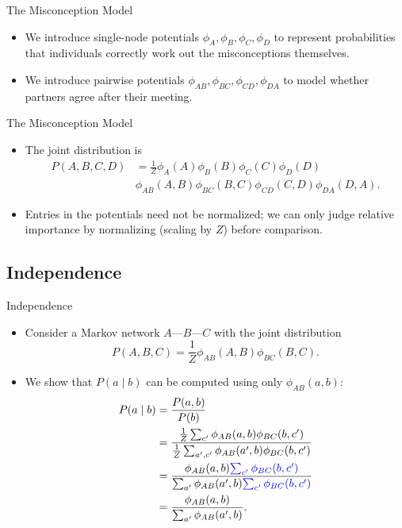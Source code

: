 \documentclass[11pt]{beamer}
\begin{document}
\begin{frame}{The Misconception Model \cite{pgmslides}}
\setlength{\topsep}{0pt}
\setlength{\partopsep}{0pt}
\vspace{0pt}
\centering
\begin{figure}[!t]
\resizebox{0.3\textwidth}{!}{\misconceptionmrf}
\end{figure}
\begin{itemize}
	\item We introduce single-node potentials $\phi_{A}, \phi_{B}, \phi_{C},
	\phi_{D}$ to represent probabilities that individuals correctly work out
	the misconceptions themselves.
	\item We introduce pairwise potentials $\phi_{AB}, \phi_{BC}, \phi_{CD},
	\phi_{DA}$ to model whether partners agree after their meeting.
\end{itemize}
\end{frame}

\begin{frame}{The Misconception Model \cite{pgmslides}}
\begin{itemize}
	\item The joint distribution is
	\begin{align*}
		P(A,B,C,D) &= \frac{1}{Z}\phi_A(A)\phi_B(B)\phi_C(C)\phi_D(D) \\
		&\phi_{AB}(A,B)\phi_{BC}(B,C)\phi_{CD}(C,D)\phi_{DA}(D,A).
	\end{align*}
	\item Entries in the potentials need not be normalized; we can only
	judge relative importance by normalizing (scaling by $Z$) before
	comparison.
\end{itemize}
\end{frame}

\subsection{Independence}

\begin{frame}{Independence \cite{pgmslides}}
\begin{itemize}
	\item Consider a Markov network $A\text{---}B\text{---}C$ with the joint
	distribution
	\[
		P(A,B,C) = \frac{1}{Z}\phi_{AB}(A,B)\phi_{BC}(B,C).
	\]
	\item We show that $P(a \;|\; b)$ can be computed using only
	$\phi_{AB}(a,b)$:
	\begin{align*}
		P(a \;|\; b) &= \frac{P(a,b)}{P(b)} \\
		&= \frac{\frac{1}{Z}\sum_{c'}\phi_{AB}(a,b)\phi_{BC}(b,c')}
		{\frac{1}{Z}\sum_{a',c'}\phi_{AB}(a',b)\phi_{BC}(b,c')} \\
		&= \frac{\phi_{AB}(a,b)
			\textcolor{blue}{\sum_{c'}\phi_{BC}(b,c')}
		}
		{\sum_{a'}\phi_{AB}(a',b)
			\textcolor{blue}{\sum_{c'}\phi_{BC}(b,c')}
		} \\
		&= \frac{\phi_{AB}(a,b)}{\sum_{a'}\phi_{AB}(a',b)}.
	\end{align*}
\end{itemize}
\end{frame}
\end{document}
